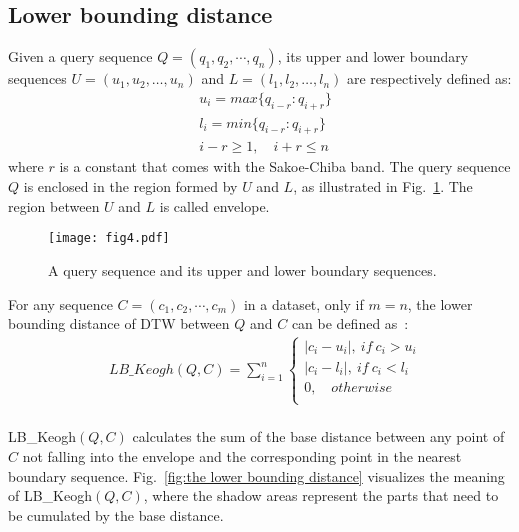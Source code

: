 \documentclass[10pt,journal,compsoc]{IEEEtran}
\begin{document}
\subsection{Lower bounding distance}

Given a query sequence $Q=(q_1, q_2, \cdots, q_n)$,
its upper and lower boundary sequences $U = (u_1, u_2,\ldots, u_n)$ and $L = (l_1, l_2,\ldots, l_n)$ are respectively defined as:
\begin{equation}\label{eq:envelope}
\begin{split}
    & u_i = max\{q_{i-r}:q_{i+r} \} \\
    & l_i = min\{q_{i-r}:q_{i+r} \} \\
    & i-r\geqslant 1, \quad  i+r\leq n
\end{split}
\end{equation}
where $r$ is a constant that comes with the Sakoe-Chiba band.
The query sequence $Q$ is enclosed in the region formed by $U$ and $L$,
as illustrated in Fig.~\ref{fig:upper and lower boundary}.
The region between $U$ and $L$ is called envelope.

\begin{figure}[htbp]
  \centering
  \texttt{[image: fig4.pdf]}
  \caption{A query sequence and its upper and lower boundary sequences.}
  \label{fig:upper and lower boundary}
\end{figure}

For any sequence $C=(c_1, c_2, \cdots, c_m)$ in a dataset,
only if $m=n$, the lower bounding distance of DTW between $Q$ and $C$ can be defined as~\cite{keogh2005exact}:
\begin{equation}\label{eq:lb dtw}
\begin{split}
    & LB\_Keogh(Q,C)= \sum\limits_{i=1}^{n}  \left\{ {\begin{array}{l}
 |c_i-u_i|,  \ if \ c_i>u_i \\
 |c_i-l_i|,  \ if \  c_i<l_i \\
  0,  \quad otherwise \\
 \end{array}} \right.  \\
\end{split}
\end{equation}

LB\_Keogh$(Q,C)$ calculates the sum of the base distance
between any point of $C$ not falling into the envelope
and the corresponding point in the nearest boundary sequence.
Fig.~\ref{fig:the lower bounding distance} visualizes the meaning of LB\_Keogh$(Q,C)$,
where the shadow areas represent the parts that need to be cumulated by the base distance.
\end{document}
